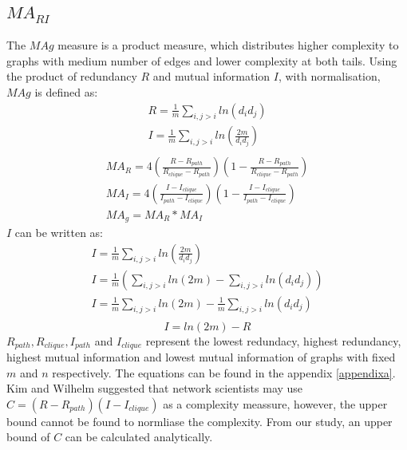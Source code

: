 \documentclass[12pt]{article}
\begin{document}
\subsection{$MA_{RI}$}
The $MAg$ measure is a product measure, which distributes higher complexity to graphs with medium number of edges and lower complexity at both tails. Using the product of redundancy $R$ and mutual information $I$, with normalisation, $MAg$ is defined as\cite{KIM20082637}:
\begin{equation}
    \label{eq:RandI}
    \begin{gathered}
        R = \frac{1}{m}\sum_{i,j>i}ln(d_id_j)\\
        I = \frac{1}{m}\sum_{i,j>i}ln(\frac{2m}{d_id_j})\\
    \end{gathered}
\end{equation}
\begin{equation}
    \label{eq:mag}
    \begin{gathered}
        MA_R = 4(\frac{R-R_{path}}{R_{clique}-R_{path}})(1-\frac{R-R_{path}}{R_{clique}-R_{path}})\\
        MA_I = 4(\frac{I-I_{clique}}{I_{path}-I_{clique}})(1-\frac{I-I_{clique}}{I_{path}-I_{clique}})\\
        MA_g = MA_R * MA_I
    \end{gathered}
\end{equation}
$I$ can be written as:
\begin{equation}
    \begin{gathered}
        \label{eq:rewriteI}
        I = \frac{1}{m}\sum_{i,j>i}ln(\frac{2m}{d_id_j})\\
        I = \frac{1}{m}(\sum_{i,j>i}ln(2m)-\sum_{i,j>i}ln(d_id_j))\\
        I = \frac{1}{m}\sum_{i,j>i}ln(2m)-\frac{1}{m}\sum_{i,j>i}ln(d_id_j)\\
    \end{gathered}
\end{equation}
\begin{equation}
    \label{eq:mutual_info}
    I = ln(2m)-R
\end{equation}
\noindent
$R_{path},R_{clique},I_{path}$ and $I_{clique}$ represent the lowest redundacy, highest redundancy, highest mutual information and lowest mutual information of graphs with fixed $m$ and $n$ respectively. The equations can be found in the appendix \ref{appendixa}. Kim and Wilhelm suggested that network scientists may use $C=(R-R_{path})(I-I_{clique})$ as a complexity meassure, however, the upper bound cannot be found to normliase the complexity. From our study, an upper bound of $C$ can be calculated analytically.\\
\end{document}
